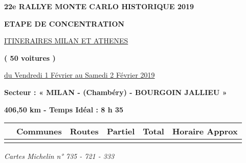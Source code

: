 \documentclass{article}%
\begin{document}
%
\normalsize%
\begin{center} \textbf{\LARGE{22e RALLYE MONTE CARLO HISTORIQUE 2019}} \end{center}%
\begin{center} \textbf{ETAPE DE CONCENTRATION} \end{center}%
\begin{center} \underline{ITINERAIRES  MILAN ET ATHENES} \end{center}%
\begin{center} \textbf{( 50 voitures )} \end{center}%
\begin{flushright} \underline{du  Vendredi 1 Février au Samedi 2 Février 2019} \end{flushright}%
\begin{flushleft} \textbf{Secteur : «  MILAN - (Chambéry) - BOURGOIN JALLIEU  »
} \end{flushleft}%
\begin{flushright} \textbf{406,50 km - Temps Idéal : 8 h 35 
} \end{flushright}%
\begin{longtable}{p{2.25cm}|p{7.0cm}|p{1.5cm}|p{1.5cm}|p{1.5cm}|p{3.5cm}}%
\hline%
&Communes&Routes&Partiel&Total&Horaire Approx\\%
\hline%
\endhead%
\endfoot%
\endlastfoot%
\hline%
\end{longtable}%
\begin{flushleft} \textit{Cartes Michelin n° 
735 - 721 - 333
} \end{flushleft}%
\end{document}
